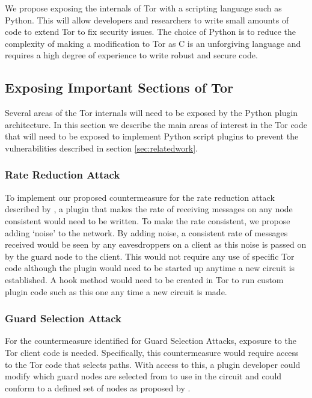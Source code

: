 \documentclass[9pt,technote]{IEEEtran}
\begin{document}
We propose exposing the internals of Tor with a scripting language such as
Python. This will allow developers and researchers to write small amounts of
code to extend Tor to fix security issues. The choice of Python is to reduce the complexity of making a modification to Tor as C is an unforgiving language and requires a high degree of experience to write robust and secure code.

\subsection{Exposing Important Sections of Tor}
Several areas of the Tor internals will need to be exposed by the Python plugin
architecture. In this section we describe the main areas of interest in the Tor
code that will need to be exposed to implement Python script plugins to prevent
the vulnerabilities described in section \ref{sec:relatedwork}.\\

\subsubsection{Rate Reduction Attack}
To implement our proposed countermeasure for the rate reduction attack described by \citeauthor{gilad2012spying}, a plugin that makes the rate of receiving messages on any node consistent would need to be written. To make the rate consistent, we propose adding `noise' to the network. By adding noise, a consistent rate of messages received would be seen by any eavesdroppers on a client as this noise is passed on by the guard node to the client. This would not require any use of specific Tor code although the plugin would need to be started up anytime a new circuit is established. A hook method would need to be created in Tor to run custom plugin code such as this one any time a new circuit is made.\\

\subsubsection{Guard Selection Attack}
For the countermeasure identified for Guard Selection Attacks, exposure to the Tor client code is needed. Specifically, this countermeasure would require access to the Tor code that selects paths. With access to this, a plugin developer could modify which guard nodes are selected from to use in the circuit and could conform to a defined set of nodes as proposed by \citeauthor{hayesguard}.\\
\end{document}
